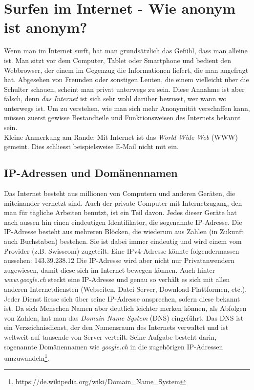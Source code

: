 \newpage
\section{Surfen im Internet - Wie anonym ist anonym?}
Wenn man im Internet surft, hat man grundsätzlich das Gefühl, dass man alleine ist.
Man sitzt vor dem Computer, Tablet oder Smartphone und bedient den Webbrowser, der einem im Gegenzug die Informationen liefert, die man angefragt hat.
Abgesehen von Freunden oder sonstigen Leuten, die einem vielleicht über die Schulter schauen, scheint man privat unterwegs zu sein.
Diese Annahme ist aber falsch, denn \textit{das Internet} ist sich sehr wohl darüber bewusst, wer wann wo unterwegs ist.
Um zu verstehen, wie man sich  mehr Anonymität verschaffen kann, müssen zuerst gewisse Bestandteile und Funktionsweisen des Internets bekannt sein.
\\
Kleine Anmerkung am Rande: Mit Internet ist das \textit{World Wide Web} (WWW) gemeint. Dies schliesst beispielsweise E-Mail nicht mit ein.

\subsection{IP-Adressen und Domänennamen}
Das Internet besteht aus millionen von Computern und anderen Geräten, die miteinander vernetzt sind.
Auch der private Computer mit Internetzugang, den man für tägliche Arbeiten benutzt, ist ein Teil davon.
Jedes dieser Geräte hat nach aussen hin einen eindeutigen Identifikator, die sogenannte IP-Adresse.
Die IP-Adresse besteht aus mehreren Blöcken, die wiederum aus Zahlen (in Zukunft auch Buchstaben) bestehen.
Sie ist dabei immer eindeutig und wird einem vom Provider (z.B. Swisscom) zugeteilt.
Eine IPv4-Adresse könnte folgendermassen aussehen: 143.39.238.12
Die IP-Adresse wird aber nicht nur Privatanwendern zugewiesen, damit diese sich im Internet bewegen können.
Auch hinter \textit{www.google.ch} steckt eine IP-Adresse und genau so verhält es sich mit allen anderen Internetdiensten (Webseiten, Datei-Server, Download-Plattformen, etc.).
Jeder Dienst liesse sich über seine IP-Adresse ansprechen, sofern diese bekannt ist.
Da sich Menschen Namen aber deutlich leichter merken können, als Abfolgen von Zahlen, hat man das \textit{Domain Name System} (DNS) eingeführt.
Das DNS ist ein Verzeichnisdienst, der den Namensraum des Internets verwaltet und ist weltweit auf tausende von Server verteilt.
Seine Aufgabe besteht darin, sogenannte Domänennamen wie \textit{google.ch} in die zugehörigen IP-Adressen umzuwandeln\footnote{https://de.wikipedia.org/wiki/Domain\_Name\_System}.

